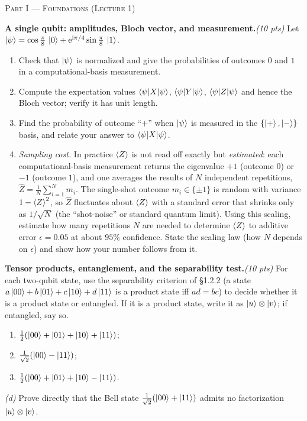 \documentclass[11pt]{article}
\newcommand{\ii}{\mathrm{i}}
\newcommand{\ee}{\mathrm{e}}
\newcommand{\pts}[1]{\hfill{\normalfont\itshape(#1 pts)}}
\begin{document}
\bigskip
\noindent\textsc{Part I --- Foundations (Lecture 1)}
\begin{problems}

\item \textbf{A single qubit: amplitudes, Bloch vector, and measurement.}\pts{10}
Let $\ket{\psi}=\cos\tfrac{\pi}{8}\,\ket{0}+\ee^{\ii\pi/4}\sin\tfrac{\pi}{8}\,\ket{1}$.
\begin{enumerate}[label=(\alph*),nosep,leftmargin=2em]
  \item Check that $\ket{\psi}$ is normalized and give the probabilities of outcomes
        $0$ and $1$ in a computational-basis measurement.
  \item Compute the expectation values $\braket{\psi|X|\psi}$, $\braket{\psi|Y|\psi}$,
        $\braket{\psi|Z|\psi}$ and hence the Bloch vector; verify it has unit length.
  \item Find the probability of outcome ``$+$'' when $\ket{\psi}$ is measured in the
        $\{\ket{+},\ket{-}\}$ basis, and relate your answer to $\braket{\psi|X|\psi}$.
  \item \emph{Sampling cost.} In practice $\braket{Z}$ is not read off exactly but
        \emph{estimated}: each computational-basis measurement returns the eigenvalue
        $+1$ (outcome $0$) or $-1$ (outcome $1$), and one averages the results of $N$
        independent repetitions, $\hat Z=\tfrac1N\sum_{i=1}^N m_i$. The single-shot
        outcome $m_i\in\{\pm1\}$ is random with variance $1-\braket{Z}^2$, so $\hat Z$
        fluctuates about $\braket{Z}$ with a standard error that shrinks only as
        $1/\sqrt N$ (the ``shot-noise'' or standard quantum limit). Using this scaling,
        estimate how many repetitions $N$ are needed to determine $\braket{Z}$ to
        additive error $\epsilon=0.05$ at about $95\%$ confidence. State the scaling
        law (how $N$ depends on $\epsilon$) and show how your number follows from it.
\end{enumerate}

\item \textbf{Tensor products, entanglement, and the separability test.}\pts{10}
For each two-qubit state, use the separability criterion of \S1.2.2 (a state
$a\ket{00}+b\ket{01}+c\ket{10}+d\ket{11}$ is a product state iff $ad=bc$) to decide
whether it is a product state or entangled. If it is a product state, write it as
$\ket{u}\otimes\ket{v}$; if entangled, say so.
\begin{enumerate}[label=(\alph*),nosep,leftmargin=2em]
  \item $\tfrac12(\ket{00}+\ket{01}+\ket{10}+\ket{11})$;
  \item $\tfrac{1}{\sqrt2}(\ket{00}-\ket{11})$;
  \item $\tfrac12(\ket{00}+\ket{01}+\ket{10}-\ket{11})$.
\end{enumerate}
\emph{(d)} Prove directly that the Bell state $\tfrac{1}{\sqrt2}(\ket{00}+\ket{11})$
admits no factorization $\ket{u}\otimes\ket{v}$.


\end{problems}
\end{document}

